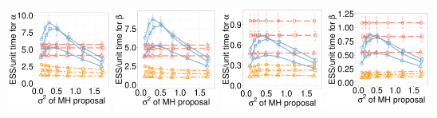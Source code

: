  \begin{figure}[H]
  \centering
  \begin{minipage}[h!]{0.99\linewidth}
  \centering
    \includegraphics [width=0.24\textwidth, angle=0]{figs/new_whole_exp_figs/q_alpha_dim3.pdf}
    \includegraphics [width=0.24\textwidth, angle=0]{figs/new_whole_exp_figs/q_beta_dim3.pdf}
    \includegraphics [width=0.24\textwidth, angle=0]{figs/new_whole_exp_figs/q_alpha_dim10.pdf}
    \includegraphics [width=0.24\textwidth, angle=0]{figs/new_whole_exp_figs/q_beta_dim10.pdf}
  \end{minipage}


\end{figure}
